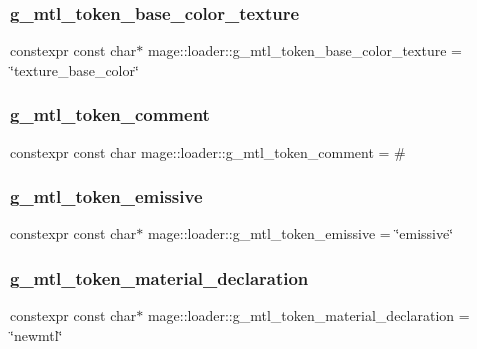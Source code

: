 \subsubsection{\texorpdfstring{g\+\_\+mtl\+\_\+token\+\_\+base\+\_\+color\+\_\+texture}{g\_mtl\_token\_base\_color\_texture}}
{\footnotesize\ttfamily constexpr const char$\ast$ mage\+::loader\+::g\+\_\+mtl\+\_\+token\+\_\+base\+\_\+color\+\_\+texture = \char`\"{}texture\+\_\+base\+\_\+color\char`\"{}}

\hypertarget{namespacemage_1_1loader_a498587a2c902ab61ab36d7251d245cc2}{}\label{namespacemage_1_1loader_a498587a2c902ab61ab36d7251d245cc2} 
\subsubsection{\texorpdfstring{g\+\_\+mtl\+\_\+token\+\_\+comment}{g\_mtl\_token\_comment}}
{\footnotesize\ttfamily constexpr const char mage\+::loader\+::g\+\_\+mtl\+\_\+token\+\_\+comment = \textquotesingle{}\#\textquotesingle{}}

\hypertarget{namespacemage_1_1loader_a81ad4167c58342acae412dc332393eab}{}\label{namespacemage_1_1loader_a81ad4167c58342acae412dc332393eab} 
\subsubsection{\texorpdfstring{g\+\_\+mtl\+\_\+token\+\_\+emissive}{g\_mtl\_token\_emissive}}
{\footnotesize\ttfamily constexpr const char$\ast$ mage\+::loader\+::g\+\_\+mtl\+\_\+token\+\_\+emissive = \char`\"{}emissive\char`\"{}}

\hypertarget{namespacemage_1_1loader_a62a4dc8f5e964317c9a98fcbe46d9168}{}\label{namespacemage_1_1loader_a62a4dc8f5e964317c9a98fcbe46d9168} 
\subsubsection{\texorpdfstring{g\+\_\+mtl\+\_\+token\+\_\+material\+\_\+declaration}{g\_mtl\_token\_material\_declaration}}
{\footnotesize\ttfamily constexpr const char$\ast$ mage\+::loader\+::g\+\_\+mtl\+\_\+token\+\_\+material\+\_\+declaration = \char`\"{}newmtl\char`\"{}}

